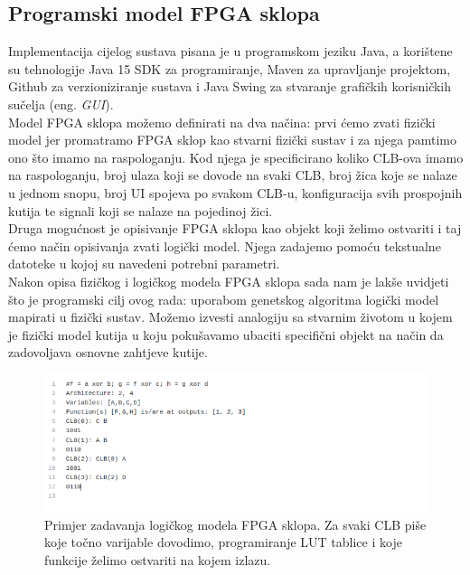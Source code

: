 \documentclass[times, utf8, zavrsni]{fer}
\begin{document}
	\subsection{Programski model FPGA sklopa}
	
	Implementacija cijelog sustava pisana je u programskom jeziku Java, a korištene su tehnologije Java 15 SDK za programiranje, Maven za upravljanje projektom, Github za verzioniziranje sustava i Java Swing za stvaranje grafičkih korisničkih sučelja (eng. \emph{GUI}).\\ Model FPGA sklopa možemo definirati na dva načina: prvi ćemo zvati fizički model jer promatramo FPGA sklop kao stvarni fizički sustav i za njega pamtimo ono što imamo na raspologanju. Kod njega je specificirano koliko CLB-ova imamo na raspologanju, broj ulaza koji se dovode na svaki CLB, broj žica koje se nalaze u jednom snopu, broj UI spojeva po svakom CLB-u, konfiguracija svih prospojnih kutija te signali koji se nalaze na pojedinoj žici.\\Druga mogućnost je opisivanje FPGA sklopa kao objekt koji želimo ostvariti i taj ćemo način opisivanja zvati logički model. Njega zadajemo pomoću tekstualne datoteke u kojoj su navedeni potrebni parametri.\\Nakon opisa fizičkog i logičkog modela FPGA sklopa sada nam je lakše uvidjeti što je programski cilj ovog rada: uporabom genetskog algoritma logički model mapirati u fizički sustav. Možemo izvesti analogiju sa stvarnim životom u kojem je fizički model kutija u koju pokušavamo ubaciti specifični objekt na način da zadovoljava osnovne zahtjeve kutije.
	
	
	\begin{figure}[H]
		\centering
		\includegraphics[width=15cm]{slike/logicalModelTxt.png}
		\caption{Primjer zadavanja logičkog modela FPGA sklopa. Za svaki CLB piše koje točno varijable dovodimo, programiranje LUT tablice i koje funkcije želimo ostvariti na kojem izlazu. }
		\label{fig:fpga-logical-model}
	\end{figure}
	
\end{document}
